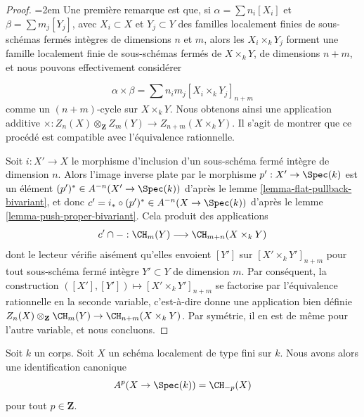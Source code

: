 \begin{proof}
{\emergencystretch=2em Une première remarque est que, si $\alpha = \sum n_i[X_i]$
et $\beta = \sum m_j[Y_j]$, avec $X_i \subset X$ et $Y_j \subset Y$
des familles localement finies de sous-schémas fermés intègres
de dimensions $n$ et $m$, alors
les $X_i \times_k Y_j$ forment une famille localement finie
de sous-schémas fermés de $X \times_k Y$, de
dimensions $n + m$, et nous pouvons effectivement considérer\par}
$$
\alpha \times \beta = \sum n_i m_j [X_i \times_k Y_j]_{n + m}
$$
comme un $(n + m)$-cycle sur $X \times_k Y$. Nous obtenons ainsi une
application additive
$\times : Z_n(X) \otimes_{\mathbf{Z}} Z_m(Y) \to Z_{n + m}(X \times_k Y)$.
Il s'agit de montrer que
ce procédé est compatible avec l'équivalence rationnelle.

\medskip\noindent
Soit $i : X' \to X$ le morphisme d'inclusion d'un
sous-schéma fermé intègre de dimension $n$.
Alors l'image inverse plate par le morphisme $p' : X' \to \Spec(k)$ est un élément
$(p')^* \in A^{-n}(X' \to \Spec(k))$ d'après le
lemme \ref{lemma-flat-pullback-bivariant},
et donc $c' = i_* \circ (p')^* \in A^{-n}(X \to \Spec(k))$ d'après le
lemme \ref{lemma-push-proper-bivariant}.
Cela produit des applications
$$
c' \cap - : \CH_m(Y) \longrightarrow \CH_{m + n}(X \times_k Y)
$$
dont le lecteur vérifie aisément qu'elles envoient $[Y']$ sur $[X' \times_k Y']_{n + m}$
pour tout sous-schéma fermé intègre $Y' \subset Y$ de dimension
$m$. Par conséquent, la construction
$([X'], [Y']) \mapsto [X' \times_k Y']_{n + m}$
se factorise par l'équivalence rationnelle en la seconde variable, c'est-à-dire
donne une application bien définie
$Z_n(X) \otimes_{\mathbf{Z}} \CH_m(Y) \to \CH_{n + m}(X \times_k Y)$.
Par symétrie, il en est de même pour l'autre variable, et nous concluons.
\end{proof}

\begin{lemma}
\label{lemma-chow-cohomology-towards-point}
Soit $k$ un corps. Soit $X$ un schéma localement de type fini sur $k$.
Nous avons alors une identification canonique
$$
A^p(X \to \Spec(k)) = \CH_{-p}(X)
$$
pour tout $p \in \mathbf{Z}$.
\end{lemma}

